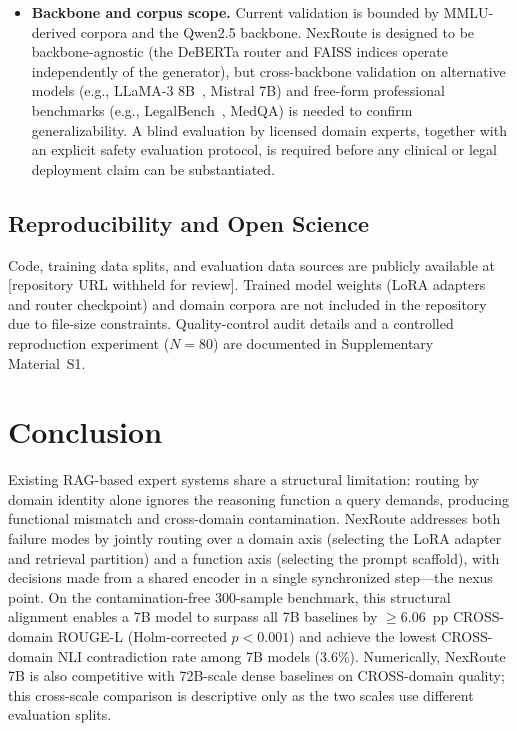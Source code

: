 \documentclass[a4paper,fleql,doubleblind]{cas-sc}
\begin{document}
\begin{itemize}
\item \textbf{Backbone and corpus scope.} Current validation is bounded by MMLU-derived corpora and the Qwen2.5
backbone. NexRoute is designed to be backbone-agnostic (the DeBERTa router
and FAISS indices operate independently of the generator), but cross-backbone
validation on alternative models (e.g., LLaMA-3 8B~\citep{grattafiori2024llama3},
Mistral 7B) and free-form professional benchmarks (e.g.,
LegalBench~\citep{guha2023legalbench}, MedQA) is needed to confirm
generalizability. A blind evaluation by licensed domain experts, together
with an explicit safety evaluation protocol, is required before any clinical
or legal deployment claim can be substantiated.
\end{itemize}
\subsection{Reproducibility and Open Science}
\label{sec:reproducibility}
Code, training data splits, and evaluation data sources are publicly available at [repository URL withheld for review]. Trained model weights (LoRA adapters and router checkpoint) and domain corpora are not included in the repository due to file-size constraints. Quality-control audit details and a controlled reproduction experiment ($N{=}80$) are documented in Supplementary Material~S1.

\section{Conclusion}
\label{sec:conclusion}
Existing RAG-based expert systems share a structural limitation: routing by domain
identity alone ignores the reasoning function a query demands, producing functional
mismatch and cross-domain contamination.
NexRoute addresses both failure modes by jointly routing over a domain axis
(selecting the LoRA adapter and retrieval partition) and a function axis
(selecting the prompt scaffold), with decisions made from a shared encoder in
a single synchronized step---the nexus point.
On the contamination-free 300-sample benchmark, this structural alignment enables a
7B model to surpass all 7B baselines by ${\geq}6.06$~pp CROSS-domain ROUGE-L
(Holm-corrected $p{<}0.001$) and achieve the lowest CROSS-domain NLI contradiction rate
among 7B models (3.6\%). Numerically, NexRoute 7B is also competitive with 72B-scale
dense baselines on CROSS-domain quality; this cross-scale comparison is descriptive only
as the two scales use different evaluation splits.
\end{document}
